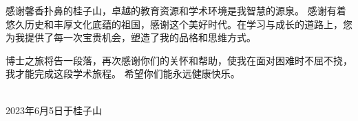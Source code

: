 感谢馨香扑鼻的桂子山，卓越的教育资源和学术环境是我智慧的源泉。
感谢有着悠久历史和丰厚文化底蕴的祖国，感谢这个美好时代。在学习与成长的道路上，您为我提供了每一次宝贵机会，塑造了我的品格和思维方式。

博士之旅将告一段落，再次感谢你们的关怀和帮助，使我在面对困难时不屈不挠，我才能完成这段学术旅程。
希望你们能永远健康快乐。

\fi

\begin{signature}
   \\
  2023年6月5日于桂子山
\end{signature}